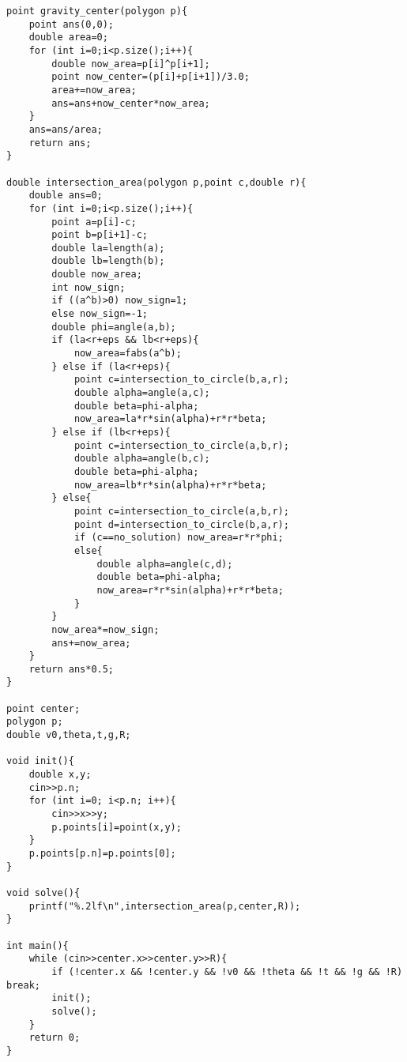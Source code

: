 \begin{verbatim}
point gravity_center(polygon p){
    point ans(0,0);
    double area=0;
    for (int i=0;i<p.size();i++){
        double now_area=p[i]^p[i+1];
        point now_center=(p[i]+p[i+1])/3.0;
        area+=now_area;
        ans=ans+now_center*now_area;
    }
    ans=ans/area;
    return ans;
}

double intersection_area(polygon p,point c,double r){
    double ans=0;
    for (int i=0;i<p.size();i++){
        point a=p[i]-c;
        point b=p[i+1]-c;
        double la=length(a);
        double lb=length(b);
        double now_area;
        int now_sign;
        if ((a^b)>0) now_sign=1;
        else now_sign=-1;
        double phi=angle(a,b);
        if (la<r+eps && lb<r+eps){
            now_area=fabs(a^b);
        } else if (la<r+eps){
            point c=intersection_to_circle(b,a,r);
            double alpha=angle(a,c);
            double beta=phi-alpha;
            now_area=la*r*sin(alpha)+r*r*beta;
        } else if (lb<r+eps){
            point c=intersection_to_circle(a,b,r);
            double alpha=angle(b,c);
            double beta=phi-alpha;
            now_area=lb*r*sin(alpha)+r*r*beta;
        } else{
            point c=intersection_to_circle(a,b,r);
            point d=intersection_to_circle(b,a,r);
            if (c==no_solution) now_area=r*r*phi;
            else{
                double alpha=angle(c,d);
                double beta=phi-alpha;
                now_area=r*r*sin(alpha)+r*r*beta;
            }
        }
        now_area*=now_sign;
        ans+=now_area;
    }
    return ans*0.5;
}

point center;
polygon p;
double v0,theta,t,g,R;

void init(){
    double x,y;
    cin>>p.n;
    for (int i=0; i<p.n; i++){
        cin>>x>>y;
        p.points[i]=point(x,y);
    }
    p.points[p.n]=p.points[0];
}

void solve(){
    printf("%.2lf\n",intersection_area(p,center,R));
}

int main(){
    while (cin>>center.x>>center.y>>R){
        if (!center.x && !center.y && !v0 && !theta && !t && !g && !R) break;
        init();
        solve();
    }
    return 0;
}
\end{verbatim}


